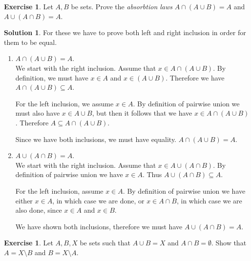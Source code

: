 \documentclass[a4paper, twocolumn]{report}
\newcounter{exercise} \numberwithin{exercise}{section}
\theoremstyle{definition}
\newtheorem{exc}[exercise]{Exercise}
\theoremstyle{solution}
\newtheorem*{sltn}{Solution}
\newcommand{\union}{\cup}
\newcommand{\intrsct}{\cap}
\begin{document}
\begin{exc}
  Let $A, B$ be sets. Prove the \textit{absorbtion laws} $A \intrsct (A \union
  B) = A$ and $A \union (A \intrsct B) = A$. 
\end{exc}

\begin{sltn}
  For these we have to prove both left and right inclusion in order for them to be equal.

  \begin{enumerate}
    \item $A \intrsct (A \union B) = A$. \\
      [0.2cm]
      We start with the right inclusion. Assume that $x \in A \intrsct (A
        \union B)$. By definition, we must have $x \in A$ and $x \in (A \union
      B)$. Therefore we have $A \intrsct (A \union B) \subseteq A$. 

      For the left inclusion, we assume $x \in A$. By definition of pairwise
      union we must also have $x \in A \union B$, but then it follows that we
      have $x \in A \intrsct (A \union B)$. Therefore $A \subseteq A \intrsct
      (A \union B)$.

      Since we have both inclusions, we must have equality.  $ A
      \intrsct (A \union B) = A$.

    \item $A \union (A \intrsct B) = A$. \\
      [0.2cm]
      We start with the right inclusion. Assume that $x \in A \union (A
      \intrsct B)$.  By definition of pairwise union we have $x \in A$. Thus $A
      \union (A \intrsct B) \subseteq A$.

      For the left inclusion, assume $x \in A$. By definition of pairwise union
      we have either $x \in A$, in which case we are done, or $x \in A \intrsct
      B$, in which case we are also done, since $x \in A$ and $x \in B$.

      We have shown both inclusions, therefore we must have $A \union (A
      \intrsct B) = A$.
  \end{enumerate}
\end{sltn}

\begin{exc}
  Let $A, B, X$ be sets such that $A \union B = X$ and $A \intrsct B =
  \emptyset$.  Show that $A = X \setminus B$ and $B = X \setminus A$. 
\end{exc}
\end{document}
